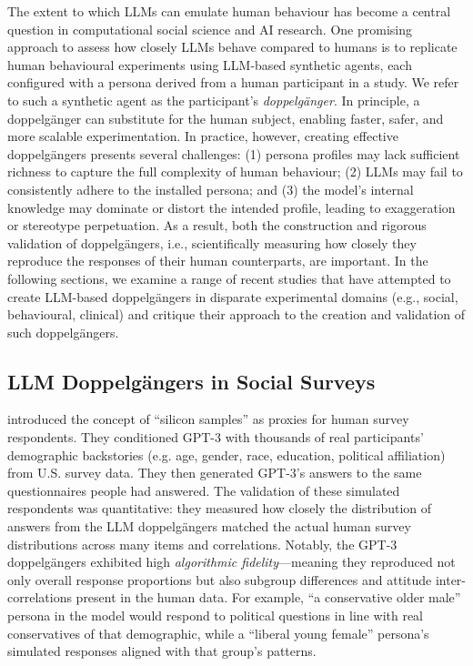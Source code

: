 The extent to which LLMs can emulate human behaviour has become a central question in computational social science and AI research. One promising approach to assess how closely LLMs behave compared to humans is to replicate human behavioural experiments using LLM-based synthetic agents, each configured with a persona derived from a human participant in a study. We refer to such a synthetic agent as the participant's \emph{doppelgänger}. In principle, a doppelgänger can substitute for the human subject, enabling faster, safer, and more scalable experimentation. In practice, however, creating effective doppelgängers presents several challenges: (1) persona profiles may lack sufficient richness to capture the full complexity of human behaviour; (2) LLMs may fail to consistently adhere to the installed persona; and (3) the model's internal knowledge may dominate or distort the intended profile, leading to exaggeration or stereotype perpetuation. As a result, both the construction and rigorous validation of doppelgängers, i.e., scientifically measuring how closely they reproduce the responses of their human counterparts, are important. In the following sections, we examine a range of recent studies that have attempted to create LLM-based doppelgängers in disparate experimental domains (e.g., social, behavioural, clinical) and critique their approach to the creation and validation of such doppelgängers.


\subsection*{LLM Doppelgängers in Social Surveys}
\citet{argyle2023} introduced the concept of ``silicon samples'' as proxies for human survey respondents. They conditioned GPT-3 with thousands of real participants' demographic backstories (e.g. age, gender, race, education, political affiliation) from U.S. survey data. They then generated GPT-3's answers to the same questionnaires people had answered. The validation of these simulated respondents was quantitative: they measured how closely the distribution of answers from the LLM doppelgängers matched the actual human survey distributions across many items and correlations. Notably, the GPT-3 doppelgängers exhibited high \textit{algorithmic fidelity}---meaning they reproduced not only overall response proportions but also subgroup differences and attitude inter-correlations present in the human data. For example, ``a conservative older male'' persona in the model would respond to political questions in line with real conservatives of that demographic, while a ``liberal young female'' persona's simulated responses aligned with that group's patterns.


